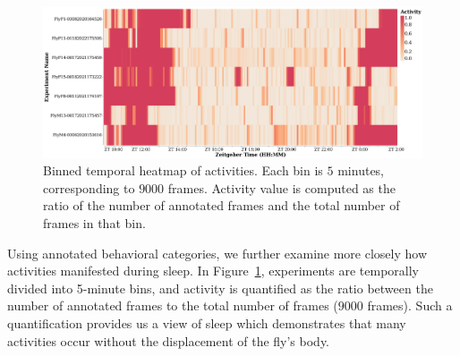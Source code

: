 \begin{figure}[htb!]
	\centering\includegraphics[width=0.995\linewidth]{figures/ActivityBinned-Ann-WT-5T.pdf}
	\caption[Binned temporal heatmap of activities.]{Binned temporal heatmap of activities.
		Each bin is $5$ minutes, corresponding to $9000$ frames.
		Activity value is computed as the ratio of the number of annotated frames and the total number of frames in that bin. \label{figure:heatmap-microactivity}}
\end{figure}

Using annotated behavioral categories, we further examine more closely how activities manifested during sleep.
In Figure~\ref{figure:heatmap-microactivity}, experiments are temporally divided into 5-minute bins, and activity is quantified as the ratio between the number of annotated frames to the total number of frames ($9000$ frames). Such a quantification provides us a view of sleep which demonstrates that many activities occur without the displacement of the fly's body.

